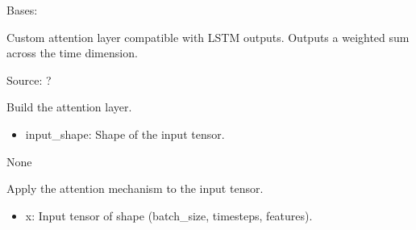 \documentclass[letterpaper,10pt,english]{sphinxmanual}
\begin{document}
\begin{fulllineitems}
\label{\detokenize{lstm_results_real_data:lstm_results_real_data.AttentionLayer}}
\pysigstartsignatures
{}
\pysigstopsignatures
\sphinxAtStartPar
Bases: 

\sphinxAtStartPar
Custom attention layer compatible with LSTM outputs.
Outputs a weighted sum across the time dimension.

\sphinxAtStartPar
Source: ?

\begin{fulllineitems}
\label{\detokenize{lstm_results_real_data:lstm_results_real_data.AttentionLayer.build}}
\pysigstartsignatures
{}
\pysigstopsignatures
\sphinxAtStartPar
Build the attention layer.
\begin{description}
\begin{itemize}
\item {} 
\sphinxAtStartPar
input\_shape: Shape of the input tensor.

\end{itemize}

\sphinxAtStartPar
None

\end{description}

\end{fulllineitems}


\begin{fulllineitems}
\label{\detokenize{lstm_results_real_data:lstm_results_real_data.AttentionLayer.call}}
\pysigstartsignatures
{}
\pysigstopsignatures
\sphinxAtStartPar
Apply the attention mechanism to the input tensor.
\begin{description}
\begin{itemize}
\item {} 
\sphinxAtStartPar
x: Input tensor of shape (batch\_size, timesteps, features).


\end{itemize}
\end{description}
\end{fulllineitems}
\end{fulllineitems}
\end{document}
